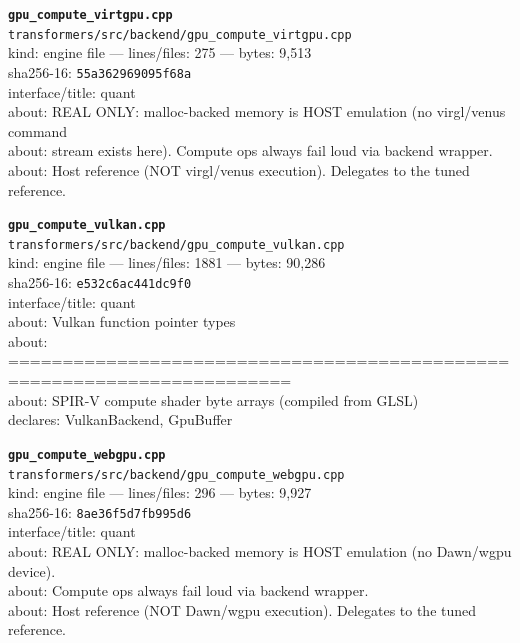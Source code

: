 \noindent\textbf{\texttt{gpu\_compute\_virtgpu.cpp}}\\
\texttt{transformers/src/backend/gpu\_compute\_virtgpu.cpp}\\
kind: engine file --- lines/files: 275 --- bytes: 9,513\\
sha256-16: \texttt{55a362969095f68a}\\
interface/title: quant\\
about: REAL ONLY: malloc-backed memory is HOST emulation (no virgl/venus command\\
about: stream exists here). Compute ops always fail loud via backend wrapper.\\
about: Host reference (NOT virgl/venus execution). Delegates to the tuned reference.\\
\vspace*{6.0pt}

\noindent\textbf{\texttt{gpu\_compute\_vulkan.cpp}}\\
\texttt{transformers/src/backend/gpu\_compute\_vulkan.cpp}\\
kind: engine file --- lines/files: 1881 --- bytes: 90,286\\
sha256-16: \texttt{e532c6ac441dc9f0}\\
interface/title: quant\\
about: Vulkan function pointer types\\
about: ========================================================================\\
about: SPIR-V compute shader byte arrays (compiled from GLSL)\\
declares: VulkanBackend, GpuBuffer\\
\vspace*{6.0pt}

\noindent\textbf{\texttt{gpu\_compute\_webgpu.cpp}}\\
\texttt{transformers/src/backend/gpu\_compute\_webgpu.cpp}\\
kind: engine file --- lines/files: 296 --- bytes: 9,927\\
sha256-16: \texttt{8ae36f5d7fb995d6}\\
interface/title: quant\\
about: REAL ONLY: malloc-backed memory is HOST emulation (no Dawn/wgpu device).\\
about: Compute ops always fail loud via backend wrapper.\\
about: Host reference (NOT Dawn/wgpu execution). Delegates to the tuned reference.\\
\vspace*{6.0pt}
\newpage

